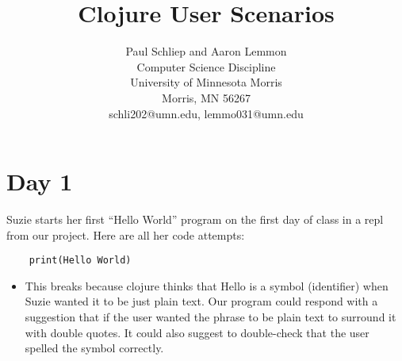 \documentclass[12pt]{article}
\newcommand{\comment}[1]{}
\begin{document}
\pagestyle{plain}
%

\title{Clojure User Scenarios}
%
%

\author{
Paul Schliep and Aaron Lemmon \\
Computer Science Discipline \\
University of Minnesota Morris\\
Morris, MN 56267\\
schli202@umn.edu, lemmo031@umn.edu
}

\date{}

\maketitle
\thispagestyle{empty}




\newpage
\setcounter{page}{1}

\section{Day 1}
Suzie starts her first “Hello World” program on the first day of class in a repl from our project. Here are all her code attempts:

\begin{verbatim}
	print(Hello World)
\end{verbatim}
\begin{itemize}
	\item This breaks because clojure thinks that Hello is a symbol (identifier) when Suzie wanted it to be just plain text. Our program could respond with a suggestion that if the user wanted the phrase to be plain text to surround it with double quotes. It could also suggest to double-check that the user spelled the symbol correctly. 
\end{itemize}
\end{document}
